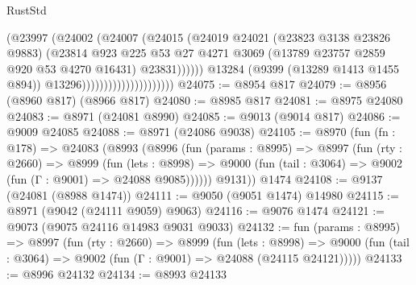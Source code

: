 \begin{lexlean}{RustStd}
\begin{coremodule}
                                              (@23997
                                                (@24002
                                                  (@24007
                                                    (@24015
                                                      (@24019
                                                        @24021
                                                        (@23823 @3138 @23826 @9883)
                                                        (@23814
                                                          @923
                                                          @225
                                                          @53
                                                          @27
                                                          @4271
                                                          @3069
                                                          (@13789
                                                            @23757
                                                            @2859
                                                            @920
                                                            @53
                                                            @4270
                                                            @16431)
                                                          @23831))))))
                                              @13284
                                              (@9399 (@13289 @1413 @1455 @894))
                                              @13296)))))))))))))))))))))
@24075 := @8954 @817
@24079 := @8956 (@8960 @817) (@8966 @817)
@24080 := @8985 @817
@24081 := @8975 @24080
@24083 := @8971 (@24081 @8990)
@24085 := @9013 (@9014 @817)
@24086 := @9009 @24085
@24088 := @8971 (@24086 @9038)
@24105 := @8970
    (fun (fn : @178) =>
    @24083
      (@8993
        (@8996
          (fun (params : @8995) =>
          @8997
            (fun (rty : @2660) =>
            @8999
              (fun (lets : @8998) =>
              @9000 (fun (tail : @3064) => @9002 (fun (Γ : @9001) => @24088 @9085))))))
        @9131))
    @1474
@24108 := @9137 (@24081 (@8988 @1474))
@24111 := @9050 (@9051 @1474) @14980
@24115 := @8971 (@9042 (@24111 @9059) @9063)
@24116 := @9076 @1474
@24121 := @9073 (@9075 @24116 @14983 @9031 @9033)
@24132 := fun (params : @8995) =>
  @8997
    (fun (rty : @2660) =>
    @8999
      (fun (lets : @8998) =>
      @9000 (fun (tail : @3064) => @9002 (fun (Γ : @9001) => @24088 (@24115 @24121)))))
@24133 := @8996 @24132
@24134 := @8993 @24133

\end{coremodule}
\end{lexlean}
